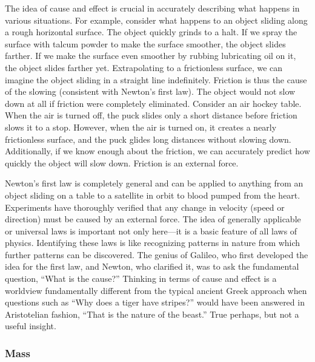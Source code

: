 \documentclass[../../main-ap-physics.tex]{subfiles}
\begin{document}
The idea of cause and effect is crucial in accurately describing what happens in various situations. For example, consider what happens to an object sliding along a rough horizontal surface. The object quickly grinds to a halt. If we spray the surface with talcum powder to make the surface smoother, the object slides farther. If we make the surface even smoother by rubbing lubricating oil on it, the object slides farther yet. Extrapolating to a frictionless surface, we can imagine the object sliding in a straight line indefinitely. Friction is thus the cause of the slowing (consistent with Newton's first law). The object would not slow down at all if friction were completely eliminated. Consider an air hockey table. When the air is turned off, the puck slides only a short distance before friction slows it to a stop. However, when the air is turned on, it creates a nearly frictionless surface, and the puck glides long distances without slowing down. Additionally, if we know enough about the friction, we can accurately predict how quickly the object will slow down. Friction is an external force.

\vspace{1em}

Newton's first law is completely general and can be applied to anything from an object sliding on a table to a satellite in orbit to blood pumped from the heart. Experiments have thoroughly verified that any change in velocity (speed or direction) must be caused by an external force. The idea of generally applicable or universal laws is important not only here---it is a basic feature of all laws of physics. Identifying these laws is like recognizing patterns in nature from which further patterns can be discovered. The genius of Galileo, who first developed the idea for the first law, and Newton, who clarified it, was to ask the fundamental question, ``What is the cause?'' Thinking in terms of cause and effect is a worldview fundamentally different from the typical ancient Greek approach when questions such as ``Why does a tiger have stripes?'' would have been answered in Aristotelian fashion, ``That is the nature of the beast.'' True perhaps, but not a useful insight.

\subsubsection*{Mass}
\end{document}
